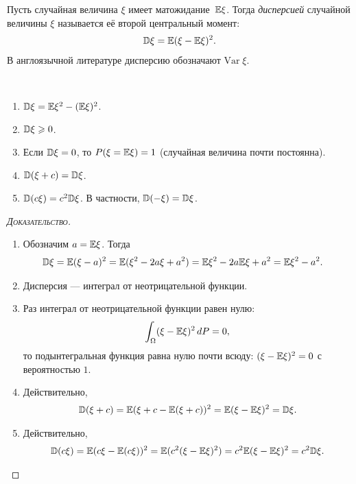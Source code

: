 \documentclass[../main.tex]{subfiles}
\begin{document}
\begin{df}[дисперсия]
 Пусть случайная величина $ \xi $ имеет матожидание~$ \mathbb E\xi $. Тогда \textit{дисперсией} случайной величины $ \xi $ называется её второй центральный момент:
 \begin{align*}
  \mathbb D \xi = \mathbb E (\xi - \mathbb E\xi)^{2}.
 \end{align*}
 В англоязычной литературе дисперсию обозначают $ \mathrm{Var} \;\xi $.
\end{df}
\begin{prop}\
 \begin{enumerate}
  \item $ \mathbb D\xi = \mathbb E\xi^{2} - (\mathbb E\xi)^{2} $.
  \item $ \mathbb D\xi \geqslant 0 $.
  \item Если $ \mathbb D\xi = 0 $, то $ P(\xi = \mathbb E\xi) = 1 $ (случайная величина почти постоянна).
  \item \label{enum:variance_plus_const} $ \mathbb D(\xi + c) = \mathbb D\xi $.
  \item \label{enum:variance_times_const} $ \mathbb D(c\xi) = c^{2}\mathbb D\xi $. В частности, $ \mathbb D(-\xi) = \mathbb D\xi $.
 \end{enumerate}
\end{prop}
\begin{proof}[\normalfont\textsc{Доказательство}]\
 \begin{enumerate}
  \item Обозначим $ a = \mathbb E\xi $. Тогда
   \begin{align*}
    \mathbb D\xi &= \mathbb E(\xi - a)^{2} = \mathbb E(\xi^{2} - 2a\xi + a^{2}) = \mathbb E\xi^{2} - 2a\mathbb E\xi + a^{2} = \mathbb E\xi^{2} - a^{2}.
   \end{align*}
  \item Дисперсия --- интеграл от неотрицательной функции.
  \item Раз интеграл от неотрицательной функции равен нулю:
   \begin{align*}
    \int_{\Omega} (\xi-\mathbb E\xi)^{2} \,dP = 0,
   \end{align*} то подынтегральная функция равна нулю почти всюду: $ (\xi - \mathbb E\xi)^{2} = 0 $ с вероятностью $ 1 $.
  \item Действительно,
   \begin{align*}
    \mathbb D(\xi + c) = \mathbb E(\xi + c - \mathbb E(\xi + c))^{2} = \mathbb E(\xi - \mathbb E\xi)^{2} = \mathbb D\xi.
   \end{align*}
  \item Действительно,
   \begin{align*}
    \mathbb D(c\xi) = \mathbb E(c\xi - \mathbb E(c\xi))^{2} = \mathbb E (c^{2}(\xi - \mathbb E\xi)^{2}) = c^{2}\mathbb E(\xi-\mathbb E\xi)^{2} = c^{2}\mathbb D\xi.
   \end{align*}
 \end{enumerate}
\end{proof}
\end{document}

